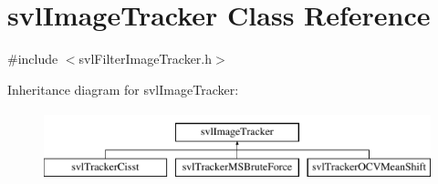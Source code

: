 \hypertarget{classsvl_image_tracker}{\section{svl\-Image\-Tracker Class Reference}
\label{classsvl_image_tracker}
}


{\ttfamily \#include $<$svl\-Filter\-Image\-Tracker.\-h$>$}

Inheritance diagram for svl\-Image\-Tracker\-:\begin{figure}[H]
\begin{center}
\leavevmode
\includegraphics[height=2.000000cm]{d6/d52/classsvl_image_tracker}
\end{center}
\end{figure}
